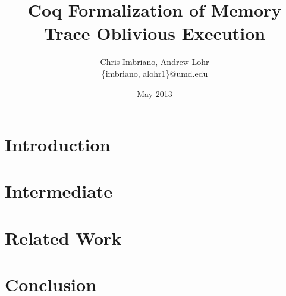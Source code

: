 \documentclass[10pt,  twocolumn]{IEEEtran}
\begin{document}
\title{Coq Formalization of Memory Trace Oblivious Execution}
\author{ Chris Imbriano, Andrew Lohr \\
\{imbriano,  alohr1\}@umd.edu }
\date{May 2013}

\maketitle



\begin{abstract}
\end{abstract}


\section{Introduction}
\label{sec:introduction}
\cite{flickrpy}

\section{Intermediate}

\section{Related Work}
\label{sec:relatedwork}

\section{Conclusion}
\label{sec:conclusion}


%
%





\end{document}
